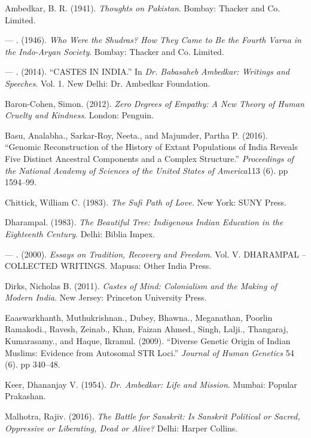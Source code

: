 \begin{thebibliography}{99}
\itemsep=0pt
 Ambedkar, B. R. (1941). \textit{Thoughts on Pakistan}. Bombay: Thacker and Co. Limited.

  --- . (1946). \textit{Who Were the Shudras? How They Came to Be the Fourth Varna in the Indo-Aryan Society}. Bombay: Thacker and Co. Limited.

  --- . (2014). “CASTES IN INDIA.” In \textit{Dr. Babasaheb Ambedkar: Writings and Speeches}. Vol. 1. New Delhi: Dr. Ambedkar Foundation.

  Baron-Cohen, Simon. (2012). \textit{Zero Degrees of Empathy: A New Theory of Human Cruelty and Kindness}. London: Penguin.

  Basu, Analabha., Sarkar-Roy, Neeta., and Majumder, Partha P. (2016). “Genomic Reconstruction of the History of Extant Populations of India Reveals Five Distinct Ancestral Components and a Complex Structure.” \textit{Proceedings of the National Academy of Sciences of the United States of America}113 (6). pp 1594–99.

  Chittick, William C. (1983). \textit{The Sufi Path of Love.} New York: SUNY Press.

  Dharampal. (1983). \textit{The Beautiful Tree: Indigenous Indian Education in the Eighteenth Century}. Delhi: Biblia Impex.

  --- . (2000). \textit{Essays on Tradition, Recovery and Freedom}. Vol. V. DHARAMPAL – COLLECTED WRITINGS. Mapusa: Other India Press.

  Dirks, Nicholas B. (2011). \textit{Castes of Mind: Colonialism and the Making of Modern India}. New Jersey: Princeton University Press.

  Eaaswarkhanth, Muthukrishnan., Dubey, Bhawna., Meganathan, Poorlin Ramakodi., Ravesh, Zeinab., Khan, Faizan Ahmed., Singh, Lalji., Thangaraj, Kumarasamy., and Haque, Ikramul. (2009). “Diverse Genetic Origin of Indian Muslims: Evidence from Autosomal STR Loci.” \textit{Journal of Human Genetics} 54 (6). pp 340–48.

  Keer, Dhananjay V. (1954). \textit{Dr. Ambedkar: Life and Mission}. Mumbai: Popular Prakashan.

  Malhotra, Rajiv. (2016). \textit{The Battle for Sanskrit: Is Sanskrit Political or Sacred, Oppressive or Liberating, Dead or Alive?} Delhi: Harper Collins.


\end{thebibliography}

